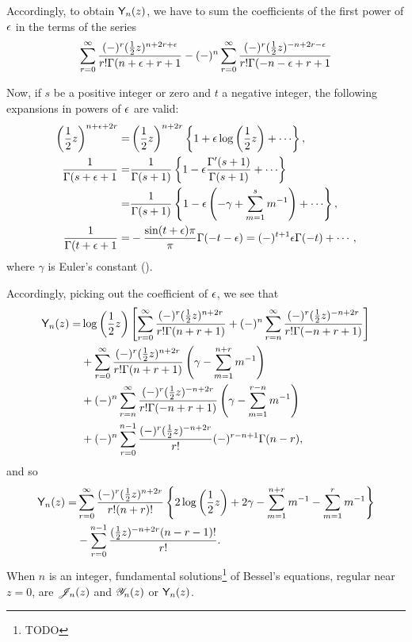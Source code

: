 Accordingly, to obtain $\mathsf{Y}_{n}(z)$, we have to sum the
coefficients of the first power of $\epsilon$ in the terms of the
series
$$
\sum_{r=0}^{\infty}
\frac{(-)^{r} (\frac{1}{2} z)^{n+2r+\epsilon}}{r! \Gamma(n+\epsilon+r+1}
-
(-)^{n}
\sum_{r=0}^{\infty}
\frac{(-)^{r} (\frac{1}{2} z)^{-n+2r -\epsilon}}{r! \Gamma(-n-\epsilon+r+1}
$$

Now, if $s$ be a positive integer or zero and $t$ a negative
integer, the following expansions in powers of $\epsilon$ are valid:
\begin{align*}
  \theparen{\half z}^{n+\eps+2r}
  =& \theparen{\half z}^{n+2r}
  \thebrace{1 + \eps\log\theparen{\half z} + \cdots},
  \\
  \frac{1}{\Gamma(s+\eps+1}
  =&
  \frac{1}{\Gamma(s+1)}
  \thebrace{
    1 - \eps \frac{\Gamma'(s+1)}{\Gamma(s+1)} + \cdots
  }
  \\
  =&
  \frac{1}{\Gamma(s+1)}
  \thebrace{
    1 - \eps\theparen{-\gamma + \sum_{m=1}^{s} m^{-1}} + \cdots
  },
  \\
  \frac{1}{\Gamma(t+\eps+1}
  =&
  - \frac{\sin(t+\eps)\pi}{\pi}
  \Gamma(-t-\eps)
  =
  (-)^{t+1} \eps \Gamma(-t) + \cdots,
\end{align*}
where $\gamma$ is Euler's constant ().

%
%
Accordingly, picking out the coefficient of $\epsilon$, we see that
\begin{align*}
  \mathsf{Y}_{n}(z)
  =&
  \log\left( \frac{1}{2} z \right)
  \left[ 
    \sum_{r=0}^{\infty}
    \frac{(-)^{r} (\frac{1}{2} z)^{n+2r}}{r! \Gamma(n+r+1)}
    + (-)^{n} \sum_{r=n}^{\infty} \frac{(-)^{r} (\frac{1}{2} z)^{-n+2r}}{r! \Gamma(-n+r+1)}
   \right]
  \\
  &
  + \sum_{r=0}^{\infty}
  \frac{(-)^{r} (\frac{1}{2} z)^{n+2r}}{r! \Gamma(n+r+1)}
  \left( \gamma - \sum_{m=1}^{n+r} m^{-1} \right)
  \\
  &
  + (-)^{n}
  \sum_{r=n}^{\infty}
  \frac{(-)^{r} (\frac{1}{2} z)^{-n+2r}}{r! \Gamma(-n+r+1)}
  \left( \gamma - \sum_{m=1}^{r-n} m^{-1} \right)
  \\
  &
  + (-)^{n}
  \sum_{r=0}^{n-1}
  \frac{ (-)^{r} (\frac{1}{2} z)^{-n+2r}}{r!}
  (-)^{r-n+1} \Gamma(n-r),
\end{align*}
and so
\begin{align*}
  \mathsf{Y}_{n}(z)
  =&
  \sum_{r=0}^{\infty}
  \frac{(-)^{r} (\frac{1}{2} z)^{n+2r}}{r!(n+r)!}
  \left\{ 
    2 \log\left( \frac{1}{2} z \right)
    + 2\gamma
    - \sum_{m=1}^{n+r} m^{-1}
    - \sum_{m=1}^{r} m^{-1}
   \right\}
  \\
  & - \sum_{r=0}^{n-1} \frac{(\frac{1}{2} z)^{-n+2r} (n-r-1)!}{r!}.
\end{align*}
When $n$ is an integer, fundamental solutions\footnote{TODO} of
Bessel's equations, regular near $z=0$, are $\mathscr{J}_{n}(z)$ and $\mathscr{Y}_{n}(z)$ or
$\mathsf{Y}_{n}(z)$.

